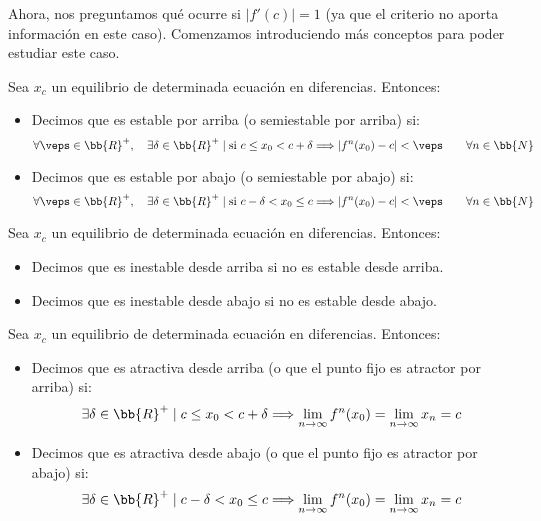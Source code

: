 Ahora, nos preguntamos qué ocurre si $|f'(c)| = 1$ (ya que el criterio no aporta información en este caso). Comenzamos introduciendo más conceptos para poder estudiar este caso.
\begin{definicion}
    Sea $x_c$ un equilibrio de determinada ecuación en diferencias. Entonces:
    \begin{itemize}
        \item Decimos que es estable por arriba (o semiestable por arriba) si:
        \begin{equation*}
            \forall \veps\in \bb{R}^+,\quad \exists \delta \in \bb{R}^+ \mid \text{si } c\leq x_0< c+\delta \Longrightarrow |f^n(x_0)-c|<\veps \qquad \forall n\in \bb{N}
        \end{equation*}

        \item Decimos que es estable por abajo (o semiestable por abajo) si:
        \begin{equation*}
            \forall \veps\in \bb{R}^+,\quad \exists \delta \in \bb{R}^+ \mid \text{si } c-\delta < x_0\leq c \Longrightarrow |f^n(x_0)-c|<\veps \qquad \forall n\in \bb{N}
        \end{equation*}
    \end{itemize}
\end{definicion}

\begin{definicion}
    Sea $x_c$ un equilibrio de determinada ecuación en diferencias. Entonces:
    \begin{itemize}
        \item Decimos que es inestable desde arriba si no es estable desde arriba.
        \item Decimos que es inestable desde abajo si no es estable desde abajo.
    \end{itemize}
\end{definicion}

\begin{definicion}
    Sea $x_c$ un equilibrio de determinada ecuación en diferencias. Entonces:
    \begin{itemize}
        \item Decimos que es atractiva desde arriba (o que el punto fijo es atractor por arriba) si:
        \begin{equation*}
            \exists \delta \in \bb{R}^+ \mid c \leq x_0 < c + \delta \Longrightarrow \lim_{n \to \infty}f^n (x_0) = \lim_{n \to \infty} x_n = c
        \end{equation*}

        \item Decimos que es atractiva desde abajo (o que el punto fijo es atractor por abajo) si:
        \begin{equation*}
            \exists \delta \in \bb{R}^+ \mid c-\delta < x_0 \leq c \Longrightarrow \lim_{n \to \infty}f^n (x_0) = \lim_{n \to \infty} x_n = c
        \end{equation*}
    \end{itemize}
\end{definicion}

